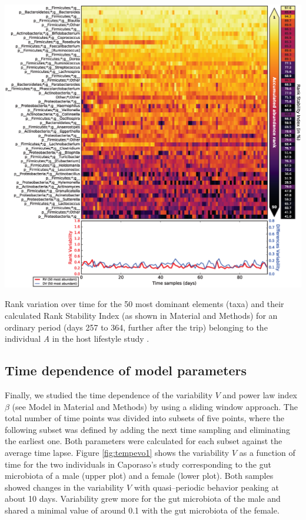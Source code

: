 \begin{supfig}
	\centering
	\includegraphics[width=1.0\textwidth]{figs/supfig_corrank_HLS_StoolA_after.eps}
	\caption{Rank variation over time for the 50 most dominant elements (taxa) and their calculated Rank Stability Index (as shown in Material and Methods) for an ordinary period (days 257 to 364, further after the trip) belonging to the individual \emph{A} in the host lifestyle study \cite{hostlife}.}
	\label{supfig:corrank_HLS_after}
\end{supfig}

\subsection*{Time dependence of model parameters}

Finally, we studied the time dependence of the variability $V$ and power law index $\beta$ (see Model in Material and Methods) by using a sliding window approach. The total number of time points was divided into subsets of five points, where the following subset was defined by adding the next time sampling and eliminating the earliest one. Both parameters were calculated for each subset against the average time lapse. Figure \ref{fig:tempevo1} shows the variability $V$ as a function of time for the two individuals in Caporaso's study\cite{moving} corresponding to the gut microbiota of a male (upper plot) and a female (lower plot). Both samples showed changes in the variability $V$ with quasi--periodic behavior peaking at about 10 days. Variability grew more for the gut microbiota of the male and shared a minimal value of around 0.1 with the gut microbiota of the female. 

